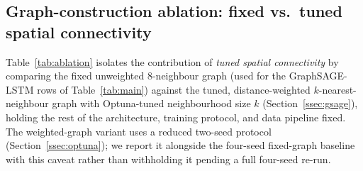 \FloatBarrier
\subsection{Graph-construction ablation: fixed vs.\ tuned spatial connectivity}
\label{ssec:ablation}

Table~\ref{tab:ablation} isolates the contribution of \emph{tuned spatial
connectivity} by comparing the fixed unweighted 8-neighbour graph (used for
the GraphSAGE-LSTM rows of Table~\ref{tab:main}) against the tuned,
distance-weighted $k$-nearest-neighbour graph with Optuna-tuned neighbourhood
size $k$ (Section~\ref{ssec:gsage}), holding the rest of the architecture,
training protocol, and data pipeline fixed. The weighted-graph variant uses a
reduced two-seed protocol (Section~\ref{ssec:optuna}); we report it alongside
the four-seed fixed-graph baseline with this caveat rather than withholding
it pending a full four-seed re-run.

\begin{table}[t]
  \centering
  \caption{Graph-construction ablation for GraphSAGE-LSTM. $\skillday$ relative
           to persistence (higher is better). Fixed graph: mean~$\pm$~std over
           4 seeds. Weighted $k$-NN graph: mean~$\pm$~std over 2 seeds
           $\{42,1\}$ (Section~\ref{ssec:optuna}). El~Paso column (\dag) is the
           pre-fix fixed-graph result (note at the start of Section~\ref{sec:results});
           its weighted $k$-NN counterpart will be reported once corrected
           retraining completes, with no fixed-vs-tuned ablation at that site
           until then (Section~\ref{sec:discussion}, Limitations).
           \textit{[Weighted $k$-NN ablation in progress; values to be
           populated as runs complete.]}}
  \label{tab:ablation}
  \setlength{\tabcolsep}{5pt}
\end{table}

